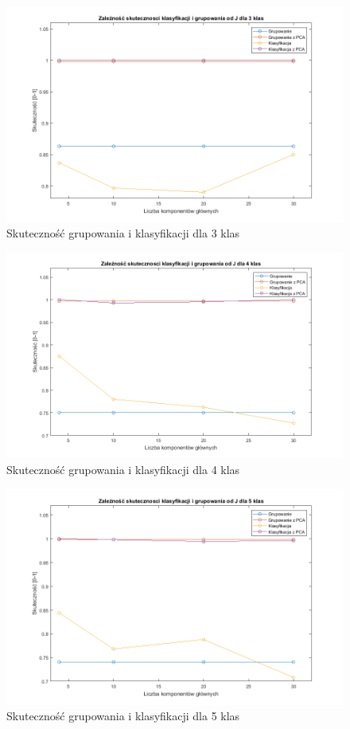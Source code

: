 \begin{figure}[H]
	\centering
	\hspace*{-0.8in}
	\includegraphics[scale = 0.7]{img/acc_from_J_3classes.png}
	\caption{Skuteczność grupowania i klasyfikacji dla 3 klas}  
	\label{rys:acc_from_J_3classes} 
\end{figure}

\begin{figure}[H]
	\centering
	\hspace*{-0.8in}
	\includegraphics[scale = 0.7]{img/acc_from_J_4classes.png}
	\caption{Skuteczność grupowania i klasyfikacji dla 4 klas}  
	\label{rys:acc_from_J_42classes} 
\end{figure}

\begin{figure}[H]
	\centering
	\hspace*{-0.8in}
	\includegraphics[scale = 0.7]{img/acc_from_J_5classes.png}
	\caption{Skuteczność grupowania i klasyfikacji dla 5 klas}  
	\label{rys:acc_from_J_5classes} 
\end{figure}